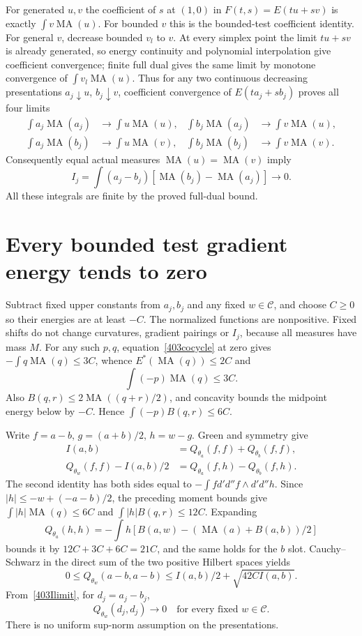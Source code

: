\documentclass[11pt]{article}
\newcommand{\DD}{d'd''}
\newcommand{\MA}{\operatorname{MA}}
\newcommand{\C}{\mathcal C}
\theoremstyle{remark}\newtheorem{remark}[theorem]{Remark}
\begin{document}
For generated $u,v$ the coefficient of $s$ at $(1,0)$ in
$F(t,s)=E(tu+sv)$ is exactly $\int v\MA(u)$.
For bounded $v$ this is the bounded-test coefficient identity.
For general $v$, decrease bounded $v_l$ to $v$. At every simplex
point the limit $tu+sv$ is already generated, so energy
continuity and polynomial interpolation give coefficient
convergence; finite full dual gives the same limit by monotone
convergence of $\int v_l\MA(u)$. Thus for any two continuous
decreasing presentations $a_j\downarrow u$, $b_j\downarrow v$,
coefficient convergence of $E(ta_j+sb_j)$ proves all four limits
\begin{align*}
\int a_j\MA(a_j)&\longrightarrow\int u\MA(u),&
\int b_j\MA(a_j)&\longrightarrow\int v\MA(u),\\
\int a_j\MA(b_j)&\longrightarrow\int u\MA(v),&
\int b_j\MA(b_j)&\longrightarrow\int v\MA(v).
\end{align*}
Consequently equal actual measures $\MA(u)=\MA(v)$ imply
\begin{equation}\label{403Ilimit}
I_j=\int(a_j-b_j)[\MA(b_j)-\MA(a_j)]\longrightarrow0.
\end{equation}
All these integrals are finite by the proved full-dual bound.

\section{Every bounded test gradient energy tends to zero}
Subtract fixed upper constants from $a_j,b_j$ and any fixed
$w\in\C$, and choose $C\ge0$ so their energies are at least
$-C$. The normalized functions are nonpositive. Fixed shifts
do not change curvatures, gradient pairings or $I_j$, because
all measures have mass $M$.
For any such $p,q$, equation~\eqref{403cocycle} at zero gives
$-\int q\MA(q)\le3C$, whence $E^*(\MA(q))\le2C$ and
\[
\int(-p)\MA(q)\le3C.
\]
Also $B(q,r)\le2\MA((q+r)/2)$, and concavity bounds the
midpoint energy below by $-C$. Hence
$\int(-p)B(q,r)\le6C$.

Write $f=a-b$, $g=(a+b)/2$, $h=w-g$. Green and symmetry give
\begin{align*}
I(a,b)&=Q_{\theta_a}(f,f)+Q_{\theta_b}(f,f),\\
Q_{\theta_w}(f,f)-I(a,b)/2
&=Q_{\theta_a}(f,h)-Q_{\theta_b}(f,h).
\end{align*}
The second identity has both sides equal to
$-\int f\DD f\wedge\DD h$. Since
$|h|\le-w+(-a-b)/2$, the preceding moment bounds give
$\int|h|\MA(q)\le6C$ and $\int|h|B(q,r)\le12C$.
Expanding
\[
Q_{\theta_a}(h,h)=
-\int h[B(a,w)-(\MA(a)+B(a,b))/2]
\]
bounds it by $12C+3C+6C=21C$, and the same holds for the
$b$ slot. Cauchy--Schwarz in the direct sum of the two positive
Hilbert spaces yields
\begin{equation}\label{403alltest}
0\le Q_{\theta_w}(a-b,a-b)
\le I(a,b)/2+\sqrt{42C I(a,b)}.
\end{equation}
From~\eqref{403Ilimit}, for $d_j=a_j-b_j$,
\begin{equation}\label{403Qlimit}
Q_{\theta_w}(d_j,d_j)\longrightarrow0
\quad\text{for every fixed }w\in\C.
\end{equation}
There is no uniform sup-norm assumption on the presentations.
\end{document}
